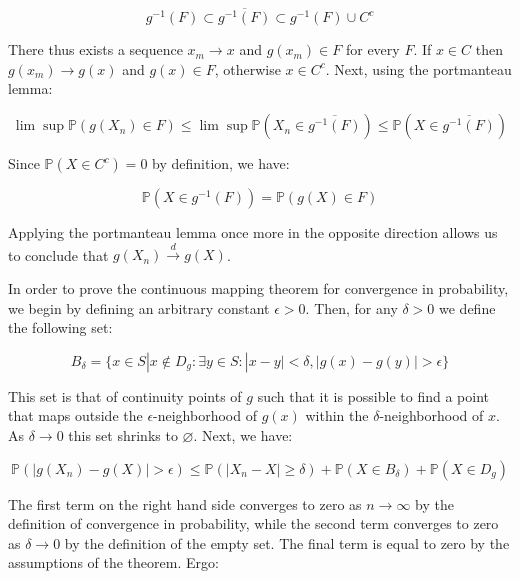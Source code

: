 \documentclass{report}
\begin{document}
\begin{equation}\label{eq:ex-lst-cmt-dist-proof-1}
    g^{-1}(F) \subset \overline{g^{-1}(F)} \subset g^{-1}(F) \cup C^c
\end{equation}

There thus exists a sequence $x_m \to x$ and $g(x_m) \in F$ for every $F$. If $x \in C$ then $g(x_m) \to g(x)$ and $g(x) \in F$, otherwise $x \in C^c$. Next, using the portmanteau lemma:

\begin{equation}\label{eq:ex-lst-cmt-dist-proof-2}
    \lim \sup \mathbb{P}(g(X_n) \in F) \le \lim \sup \mathbb{P}\left(X_n \in \overline{g^{-1}(F)}\right) \le \mathbb{P}\left(X \in \overline{g^{-1}(F)}\right)
\end{equation}

Since $\mathbb{P}(X \in C^c) = 0$ by definition, we have:

\begin{equation}\label{eq:ex-lst-cmt-dist-proof-3}
    \mathbb{P}(X \in g^{-1}(F)) = \mathbb{P}(g(X) \in F)
\end{equation}

Applying the portmanteau lemma once more in the opposite direction allows us to conclude that $g(X_n) \overset{d}{\to} g(X)$. 

In order to prove the continuous mapping theorem for convergence in probability, we begin by defining an arbitrary constant $\epsilon > 0$. Then, for any $\delta > 0$ we define the following set:

\begin{equation}\label{eq:ex-lst-cmt-prob-proof-1}
    B_\delta = \{x \in S | x \notin D_g : \exists y \in S : |x - y| < \delta, |g(x) - g(y)| > \epsilon \} 
\end{equation}

This set is that of continuity points of $g$ such that it is possible to find a point that maps outside the $\epsilon$-neighborhood of $g(x)$ within the $\delta$-neighborhood of $x$. As $\delta \to 0$ this set shrinks to $\varnothing$. Next, we have:

\begin{equation}\label{eq:ex-lst-cmt-prob-proof-2}
    \mathbb{P}(|g(X_n) - g(X)| > \epsilon) \leq \mathbb{P}(|X_n - X| \geq \delta) + \mathbb{P}(X \in B_\delta) + \mathbb{P}(X \in D_g)
\end{equation}

The first term on the right hand side converges to zero as $n \to \infty$ by the definition of convergence in probability, while the second term converges to zero as $\delta \to 0$ by the definition of the empty set. The final term is equal to zero by the assumptions of the theorem. Ergo:
\end{document}

